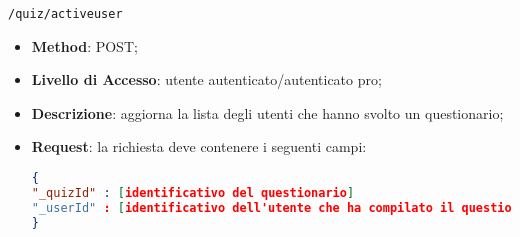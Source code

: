 	\item \texttt{/quiz/activeuser}
		\begin{itemize}
			\item \textbf{Method}: POST;
			\item \textbf{Livello di Accesso}: utente autenticato/autenticato pro;
			\item \textbf{Descrizione}: aggiorna la lista degli utenti che hanno svolto un questionario;
			\item \textbf{Request}: la richiesta deve contenere i seguenti campi:
\begin{lstlisting}[language=json,firstnumber=1]
{
"_quizId" : [identificativo del questionario]
"_userId" : [identificativo dell'utente che ha compilato il questionario]
}
\end{lstlisting}
		\end{itemize}